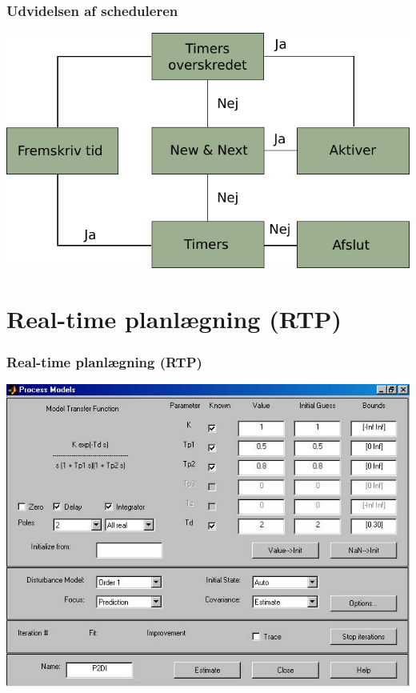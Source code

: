 \documentclass[12pt]{beamer}
\begin{document}
 
\begin{frame}
\frametitle{Udvidelsen af scheduleren}
\includegraphics[scale=0.9]{des-scheduler} 
\end{frame}


\section{Real-time planlægning (RTP)}
\begin{frame}
  \frametitle{Real-time planlægning (RTP)}
\includegraphics[scale=0.35]{Process_Model_GUI} 
\end{frame}
\end{document}
